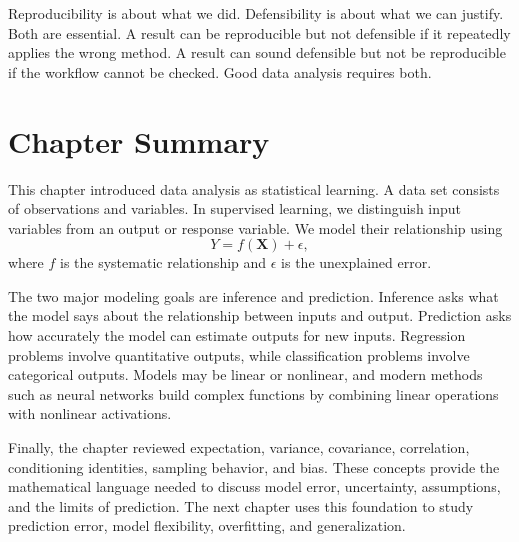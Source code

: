 Reproducibility is about what we did.  Defensibility is about what we can justify.  Both are essential.  A result can be reproducible but not defensible if it repeatedly applies the wrong method.  A result can sound defensible but not be reproducible if the workflow cannot be checked.  Good data analysis requires both.

\section{Chapter Summary}

This chapter introduced data analysis as statistical learning.  A data set consists of observations and variables.  In supervised learning, we distinguish input variables from an output or response variable.  We model their relationship using
\[
  Y = f(\mathbf{X}) + \epsilon,
\]
where $f$ is the systematic relationship and $\epsilon$ is the unexplained error.

The two major modeling goals are inference and prediction.  Inference asks what the model says about the relationship between inputs and output.  Prediction asks how accurately the model can estimate outputs for new inputs.  Regression problems involve quantitative outputs, while classification problems involve categorical outputs.  Models may be linear or nonlinear, and modern methods such as neural networks build complex functions by combining linear operations with nonlinear activations.

Finally, the chapter reviewed expectation, variance, covariance, correlation, conditioning identities, sampling behavior, and bias.  These concepts provide the mathematical language needed to discuss model error, uncertainty, assumptions, and the limits of prediction.  The next chapter uses this foundation to study prediction error, model flexibility, overfitting, and generalization.
